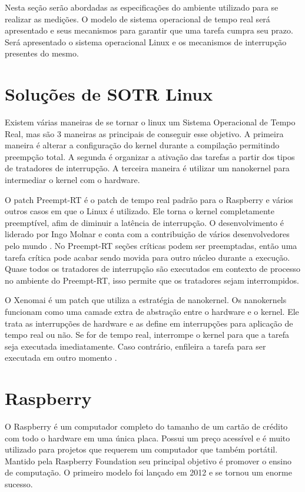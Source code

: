 
Nesta seção serão abordadas as especificações do ambiente utilizado para se realizar as medições. O modelo de sistema operacional de tempo real será apresentado e seus mecanismos para garantir que uma tarefa cumpra seu prazo. Será apresentado o sistema operacional Linux e os mecanismos de interrupção presentes do mesmo.

\section{Soluções de SOTR Linux}

Existem várias maneiras de se tornar o linux um Sistema Operacional de Tempo Real, mas são 3 maneiras as principais de conseguir esse objetivo. A primeira maneira é alterar a configuração do kernel durante a compilação permitindo preempção total. A segunda é organizar a ativação das tarefas a partir dos tipos de tratadores de interrupção. A terceira maneira é utilizar um nanokernel para intermediar o kernel com o hardware. 

O patch Preempt-RT é o patch de tempo real padrão para o Raspberry e vários outros casos em que o Linux é utilizado. Ele torna o kernel completamente preemptível, afim de diminuir a latência de interrupção. O desenvolvimento é liderado por Ingo Molnar e conta com a contribuição de vários desenvolvedores pelo mundo  \cite{McKenney2005, Molnar2016}. No Preempt-RT seções críticas podem ser preemptadas, então uma tarefa crítica pode acabar sendo movida para outro núcleo durante a execução. Quase todos os tratadores de interrupção são executados em contexto de processo no ambiente do Preempt-RT, isso permite que os tratadores sejam interrompidos.

O Xenomai é um patch que utiliza a estratégia de nanokernel. Os nanokernels funcionam como uma camade extra de abstração entre o hardware e o kernel. Ele trata as interrupções de hardware e as define em interrupções para aplicação de tempo real ou não. Se for de tempo real, interrompe o kernel para que a tarefa seja executada imediatamente. Caso contrário, enfileira a tarefa para ser executada em outro momento \cite{Xenomai2005}.

\section{Raspberry}

O Raspberry é um computador completo do tamanho de um cartão de crédito com todo o hardware em uma única placa. Possui um preço acessível e é muito utilizado para projetos que requerem um computador que também portátil. Mantido pela Raspberry Foundation \cite{RPF2019} seu principal objetivo é promover o ensino de computação. O primeiro modelo foi lançado em 2012 e se tornou um enorme sucesso.

